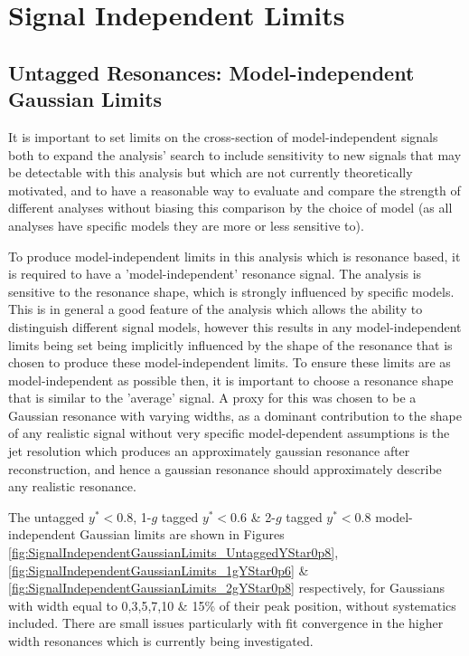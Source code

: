 \section{Signal Independent Limits}
    \subsection{Untagged Resonances: Model-independent Gaussian Limits}
        It is important to set limits on the cross-section of model-independent signals both to expand the analysis' search to include sensitivity to new signals that may be detectable with this analysis but which are not currently theoretically motivated, and to have a reasonable way to evaluate and compare the strength of different analyses without biasing this comparison by the choice of model (as all analyses have specific models they are more or less sensitive to).

        To produce model-independent limits in this analysis which is resonance based, it is required to have a 'model-independent' resonance signal. The analysis is sensitive to the resonance shape, which is strongly influenced by specific models. This is in general a good feature of the analysis which allows the ability to distinguish different signal models, however this results in any model-independent limits being set being implicitly influenced by the shape of the resonance that is chosen to produce these model-independent limits. To ensure these limits are as model-independent as possible then, it is important to choose a resonance shape that is similar to the 'average' signal. A proxy for this was chosen to be a Gaussian resonance with varying widths, as a dominant contribution to the shape of any realistic signal without very specific model-dependent assumptions is the jet resolution which produces an approximately gaussian resonance after reconstruction, and hence a gaussian resonance should approximately describe any realistic resonance.

        The untagged $y^{*} < 0.8$, 1-$g$ tagged $y^{*} < 0.6$ \& 2-$g$ tagged $y^{*} < 0.8$ model-independent Gaussian limits are shown in Figures \ref{fig:SignalIndependentGaussianLimits_UntaggedYStar0p8}, \ref{fig:SignalIndependentGaussianLimits_1gYStar0p6} \& \ref{fig:SignalIndependentGaussianLimits_2gYStar0p8} respectively, for Gaussians with width equal to 0,3,5,7,10 \& 15\% of their peak position, without systematics included. There are small issues particularly with fit convergence in the higher width resonances which is currently being investigated.

